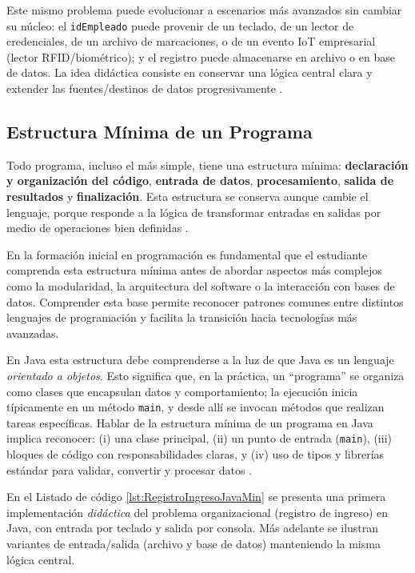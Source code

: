 \documentclass[12pt,twoside]{book}
\begin{document}
				Este mismo problema puede evolucionar a escenarios más avanzados sin cambiar su núcleo: el \texttt{idEmpleado} puede provenir de un teclado, de un lector de credenciales, de un archivo de marcaciones, o de un evento IoT empresarial (lector RFID/biométrico); y el registro puede almacenarse en archivo o en base de datos. La idea didáctica consiste en conservar una lógica central clara y extender las fuentes/destinos de datos progresivamente \cite{Pressman2019Software,Sommerville2015Software}.
				
				\subsection{Estructura Mínima de un Programa}
					\noindent
					Todo programa, incluso el más simple, tiene una estructura mínima: \textbf{declaración y organización del código}, \textbf{entrada de datos}, \textbf{procesamiento}, \textbf{salida de resultados} y \textbf{finalización}. Esta estructura se conserva aunque cambie el lenguaje, porque responde a la lógica de transformar entradas en salidas por medio de operaciones bien definidas \cite{Farrell2018Programming,Gaddis2022Starting}.
					
					En la formación inicial en programación es fundamental que el estudiante comprenda esta estructura mínima antes de abordar aspectos más complejos como la modularidad, la arquitectura del software o la interacción con bases de datos. Comprender esta base permite reconocer patrones comunes entre distintos lenguajes de programación y facilita la transición hacia tecnologías más avanzadas.
					
					En Java esta estructura debe comprenderse a la luz de que Java es un lenguaje \emph{orientado a objetos}. Esto significa que, en la práctica, un ``programa'' se organiza como clases que encapsulan datos y comportamiento; la ejecución inicia típicamente en un método \texttt{main}, y desde allí se invocan métodos que realizan tareas específicas. Hablar de la estructura mínima de un programa en Java implica reconocer: (i) una clase principal, (ii) un punto de entrada (\texttt{main}), (iii) bloques de código con responsabilidades claras, y (iv) uso de tipos y librerías estándar para validar, convertir y procesar datos \cite{Booch2007Object,Sebesta2018Concepts,Pressman2019Software}.
					
					En el Listado de código \ref{lst:RegistroIngresoJavaMin} se presenta una primera implementación \emph{didáctica} del problema organizacional (registro de ingreso) en Java, con entrada por teclado y salida por consola. Más adelante se ilustran variantes de entrada/salida (archivo y base de datos) manteniendo la misma lógica central.
					
\end{document}
